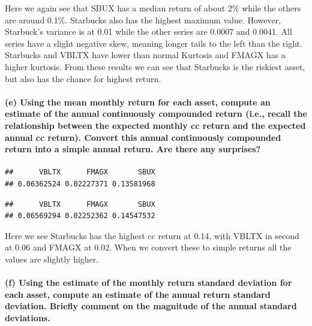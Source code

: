 \documentclass[]{article}
\let\oldparagraph\paragraph
\renewcommand{\paragraph}[1]{\oldparagraph{#1}\mbox{}}
\begin{document}
Here we again see that SBUX has a median return of about 2\% while the
others are around 0.1\%. Starbucks also has the highest maximum value.
However, Starbuck's variance is at 0.01 while the other series are
0.0007 and 0.0041. All series have a slight negative skew, meaning
longer tails to the left than the right. Starbucks and VBLTX have lower
than normal Kurtosis and FMAGX has a higher kurtosis. From these results
we can see that Starbucks is the riskiest asset, but also has the chance
for highest return.

\paragraph{(e) Using the mean monthly return for each asset, compute an
estimate of the annual continuously compounded return (i.e., recall the
relationship between the expected monthly cc return and the expected
annual cc return). Convert this annual continuously compounded return
into a simple annual return. Are there any
surprises?}\label{e-using-the-mean-monthly-return-for-each-asset-compute-an-estimate-of-the-annual-continuously-compounded-return-i.e.-recall-the-relationship-between-the-expected-monthly-cc-return-and-the-expected-annual-cc-return.-convert-this-annual-continuously-compounded-return-into-a-simple-annual-return.-are-there-any-surprises}

\begin{verbatim}
##      VBLTX      FMAGX       SBUX 
## 0.06362524 0.02227371 0.13581968
\end{verbatim}

\begin{verbatim}
##      VBLTX      FMAGX       SBUX 
## 0.06569294 0.02252362 0.14547532
\end{verbatim}

Here we see Starbucks has the highest cc return at 0.14, with VBLTX in
second at 0.06 and FMAGX at 0.02. When we convert these to simple
returns all the values are slightly higher.

\paragraph{(f) Using the estimate of the monthly return standard
deviation for each asset, compute an estimate of the annual return
standard deviation. Briefly comment on the magnitude of the annual
standard
deviations.}\label{f-using-the-estimate-of-the-monthly-return-standard-deviation-for-each-asset-compute-an-estimate-of-the-annual-return-standard-deviation.-briefly-comment-on-the-magnitude-of-the-annual-standard-deviations.}
\end{document}
